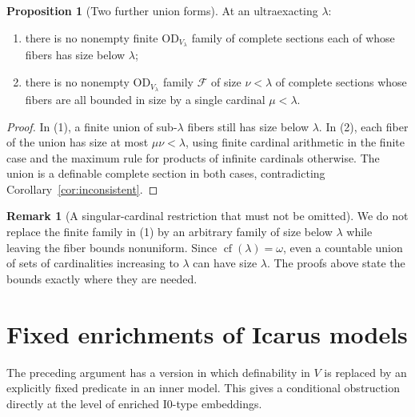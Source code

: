 \documentclass[11pt,letterpaper]{article}
\theoremstyle{definition}
\newtheorem{proposition}[definition]{Proposition}
\newcommand{\OD}{\mathrm{OD}}
\newcommand{\cf}{\operatorname{cf}}
\newcommand{\Izero}{\mathrm{I0}}
\newtheorem{remark}[definition]{Remark}
\numberwithin{equation}{section}
\begin{document}
\begin{proposition}[Two further union forms]\label{prop:union-forms}
At an ultraexacting $\lambda$:
\begin{enumerate}
\item there is no nonempty finite $\OD_{V_\lambda}$ family of complete sections each of whose fibers has size below $\lambda$;
\item there is no nonempty $\OD_{V_\lambda}$ family $\mathcal F$ of size $\nu<\lambda$ of complete sections whose fibers are all bounded in size by a single cardinal $\mu<\lambda$.
\end{enumerate}
\end{proposition}
\begin{proof}
In (1), a finite union of sub-$\lambda$ fibers still has size below $\lambda$. In (2), each fiber of the union has size at most $\mu\nu<\lambda$, using finite cardinal arithmetic in the finite case and the maximum rule for products of infinite cardinals otherwise. The union is a definable complete section in both cases, contradicting Corollary~\ref{cor:inconsistent}.
\end{proof}

\begin{remark}[A singular-cardinal restriction that must not be omitted]
We do not replace the finite family in (1) by an arbitrary family of size below $\lambda$ while leaving the fiber bounds nonuniform. Since $\cf(\lambda)=\omega$, even a countable union of sets of cardinalities increasing to $\lambda$ can have size $\lambda$. The proofs above state the bounds exactly where they are needed.
\end{remark}

\section{Fixed enrichments of Icarus models}\label{sec:icarus}

The preceding argument has a version in which definability in $V$ is replaced by an explicitly fixed predicate in an inner model. This gives a conditional obstruction directly at the level of enriched $\Izero$-type embeddings.
\end{document}
